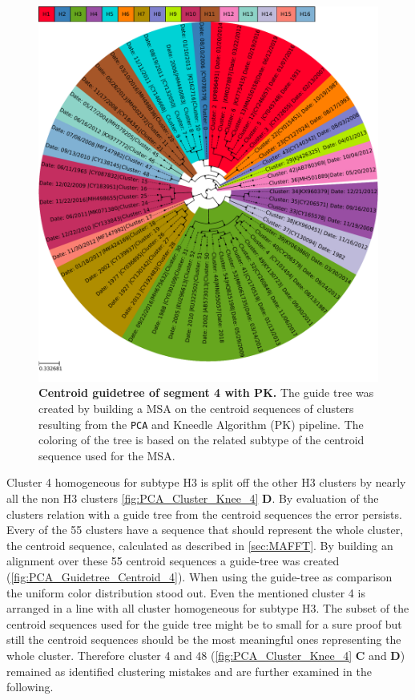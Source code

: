 \begin{figure}[!hbt]
    \centering
    \includegraphics[width=\textwidth]{PCA/Guidetree_segment_4_H_Centroid.pdf}
    \caption[Centroid guidetree of segment 4 with PK]{\textbf{Centroid guidetree of segment 4 with PK.} The guide tree was created by building a \gls{MSA} on the centroid sequences of clusters resulting from the \texttt{PCA} and Kneedle Algorithm (PK) pipeline. The coloring of the tree is based on the related subtype of the centroid sequence used for the \gls{MSA}.}
    \label{fig:PCA_Guidetree_Centroid_4}
\end{figure}

Cluster 4 homogeneous for subtype H3 is split off the other H3 clusters by nearly all the non H3 clusters \autoref{fig:PCA_Cluster_Knee_4} \textbf{\textsf{D}}. By evaluation of the clusters relation with a guide tree from the centroid sequences the error persists. Every of the 55 clusters have a sequence that should represent the whole cluster, the centroid sequence, calculated as described in \autoref{sec:MAFFT}. By building an alignment over these 55 centroid sequences a guide-tree was created (\autoref{fig:PCA_Guidetree_Centroid_4}). When using the guide-tree as comparison the uniform color distribution stood out. Even the mentioned cluster 4 is arranged in a line with all cluster homogeneous for subtype H3. The subset of the centroid sequences used for the guide tree might be to small for a sure proof but still the centroid sequences should be the most meaningful ones representing the whole cluster. Therefore cluster 4 and 48 (\autoref{fig:PCA_Cluster_Knee_4} \textbf{\textsf{C}} and \textbf{\textsf{D}}) remained as identified clustering mistakes and are further examined in the following.

